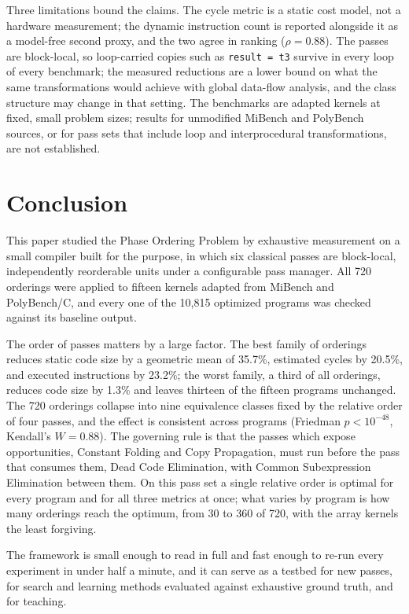 \documentclass[conference]{IEEEtran}
\begin{document}
Three limitations bound the claims. The cycle metric is a static cost model, not a hardware measurement; the dynamic instruction count is reported alongside it as a model-free second proxy, and the two agree in ranking ($\rho = 0.88$). The passes are block-local, so loop-carried copies such as \texttt{result = t3} survive in every loop of every benchmark; the measured reductions are a lower bound on what the same transformations would achieve with global data-flow analysis, and the class structure may change in that setting. The benchmarks are adapted kernels at fixed, small problem sizes; results for unmodified MiBench and PolyBench sources, or for pass sets that include loop and interprocedural transformations, are not established.

\section{Conclusion}
This paper studied the Phase Ordering Problem by exhaustive measurement on a small compiler built for the purpose, in which six classical passes are block-local, independently reorderable units under a configurable pass manager. All 720 orderings were applied to fifteen kernels adapted from MiBench and PolyBench/C, and every one of the 10,815 optimized programs was checked against its baseline output.

The order of passes matters by a large factor. The best family of orderings reduces static code size by a geometric mean of 35.7\%, estimated cycles by 20.5\%, and executed instructions by 23.2\%; the worst family, a third of all orderings, reduces code size by 1.3\% and leaves thirteen of the fifteen programs unchanged. The 720 orderings collapse into nine equivalence classes fixed by the relative order of four passes, and the effect is consistent across programs (Friedman $p < 10^{-48}$, Kendall's $W = 0.88$). The governing rule is that the passes which expose opportunities, Constant Folding and Copy Propagation, must run before the pass that consumes them, Dead Code Elimination, with Common Subexpression Elimination between them. On this pass set a single relative order is optimal for every program and for all three metrics at once; what varies by program is how many orderings reach the optimum, from 30 to 360 of 720, with the array kernels the least forgiving.

The framework is small enough to read in full and fast enough to re-run every experiment in under half a minute, and it can serve as a testbed for new passes, for search and learning methods evaluated against exhaustive ground truth, and for teaching.
\end{document}
